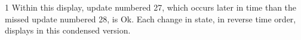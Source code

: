 \begin{ManPage}{\label{man-condor-updates-stats}}{1}
Within this display, update numbered 27, which occurs later in time
than the missed update numbered 28, is Ok.
Each change in state, in reverse time order, displays in this
condensed version.
\normalsize


\end{ManPage}
